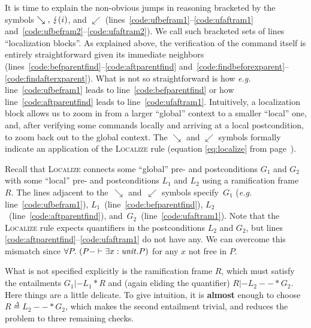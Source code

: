 \documentclass[acmsmall,review,anonymous]{acmart}\settopmatter{printfolios=true,printccs=false,printacmref=false}
\newcommand{\defeq}{\mathbin{\stackrel{\Delta}{=}}}
\begin{document}
It is time to explain the non-obvious jumps in reasoning bracketed by the
symbols $\searrow \text{, } \lightning(i)$, and $\swarrow$
(lines~\ref{code:ufbefram1}--\ref{code:ufaftram1} and~\ref{code:ufbefram2}--\ref{code:ufaftram2}). We call such bracketed sets of lines ``localization blocks''.
As explained above, the verification of the command itself is entirely
straightforward given its immediate neighbors
(lines~\ref{code:befparentfind}--\ref{code:aftparentfind}
and~\ref{code:findbeforexparent}--\ref{code:findafterxparent}).
What is not so straightforward is how \emph{e.g.} line~\ref{code:ufbefram1}
leads to line~\ref{code:befparentfind} or how line~\ref{code:aftparentfind}
leads to line~\ref{code:ufaftram1}.
Intuitively, a localization block allows us to zoom in from a larger
``global'' context to a smaller ``local'' one, and, after verifying some commands
locally and arriving at a local postcondition, to zoom back out to the global
context. The $\searrow$ and $\swarrow$ symbols formally indicate an application
of the \textsc{Localize} rule (equation \ref{eq:localize} from page~\pageref{eq:localize}).

Recall that \textsc{Localize} connects some ``global'' pre- and postconditions $G_1$ and $G_2$
with some ``local'' pre- and postconditions $L_1$ and $L_2$ using a ramification
frame $R$.
The lines adjacent to
the~$\searrow$ and~$\swarrow$ symbols specify~$G_1$ (\emph{e.g.} line~\ref{code:ufbefram1}),
$L_1$~(line~\ref{code:befparentfind}),
$L_2$~(line~\ref{code:aftparentfind}), and~$G_2$~(line~\ref{code:ufaftram1}).
Note that the \textsc{Localize} rule expects quantifiers in the postconditions $L_2$ and $G_2$,
but lines \ref{code:aftparentfind}--\ref{code:ufaftram1} do not have any.  We can overcome
this mismatch since $\forall P.~ (P -|- \exists x : \mathit{unit}.P)$ for any $x$ not free in $P$. 


What is not specified explicitly is the ramification frame $R$, which must satisfy
the entailments $G_1 |- L_1 * R$ and (again eliding the quantifier) $R |- L_2 --* G_2$.
Here things are a little delicate.  To give intuition, it is \textbf{almost} enough to choose
$R \defeq L_2 --* G_2$, which makes the second entailment trivial, and reduces the problem
to three remaining checks.
\end{document}
